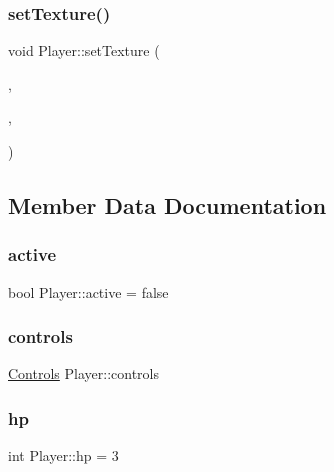 \subsubsection{\texorpdfstring{setTexture()}{setTexture()}\hspace{0.1cm}{\footnotesize\ttfamily [2/2]}}
{\footnotesize\ttfamily void Player\+::set\+Texture (\begin{DoxyParamCaption}\item[{\mbox{\hyperlink{class_game_engine}{Game\+Engine}} $\ast$}]{,  }\item[{std\+::string}]{,  }\item[{sf\+::\+Int\+Rect}]{ }\end{DoxyParamCaption})}



\subsection{Member Data Documentation}
\mbox{\label{class_player_a983d905fd90661bd69b40d8a1259e156}} 
\subsubsection{\texorpdfstring{active}{active}}
{\footnotesize\ttfamily bool Player\+::active = false}

\mbox{\label{class_player_a13625a09fdc72185e82ff5f6894049af}} 
\subsubsection{\texorpdfstring{controls}{controls}}
{\footnotesize\ttfamily \mbox{\hyperlink{struct_controls}{Controls}} Player\+::controls\hspace{0.3cm}{\ttfamily [private]}}

\mbox{\label{class_player_a2baad6b9a274417a7374baf11d5f723d}} 
\subsubsection{\texorpdfstring{hp}{hp}}
{\footnotesize\ttfamily int Player\+::hp = 3\hspace{0.3cm}{\ttfamily [private]}}

